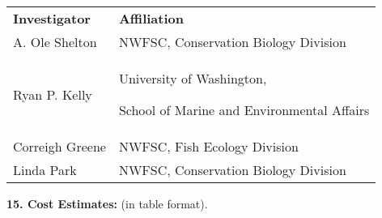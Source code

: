 \documentclass[]{article}
\begin{document}
\begin{longtable}[]{@{}ll@{}}
\toprule
\begin{minipage}[t]{0.47\columnwidth}\raggedright\strut
\textbf{Investigator}\strut
\end{minipage} & \begin{minipage}[t]{0.47\columnwidth}\raggedright\strut
\textbf{Affiliation}\strut
\end{minipage}\tabularnewline
\begin{minipage}[t]{0.47\columnwidth}\raggedright\strut
A. Ole Shelton\strut
\end{minipage} & \begin{minipage}[t]{0.47\columnwidth}\raggedright\strut
NWFSC, Conservation Biology Division\strut
\end{minipage}\tabularnewline
\begin{minipage}[t]{0.48\columnwidth}\raggedright\strut
Ryan P. Kelly\strut
\end{minipage} & \begin{minipage}[t]{0.48\columnwidth}\raggedright\strut
University of Washington,{~}

School of Marine and Environmental Affairs\strut
\end{minipage}\tabularnewline
\begin{minipage}[t]{0.47\columnwidth}\raggedright\strut
Correigh Greene\strut
\end{minipage} & \begin{minipage}[t]{0.47\columnwidth}\raggedright\strut
NWFSC, Fish Ecology Division\strut
\end{minipage}\tabularnewline
\begin{minipage}[t]{0.47\columnwidth}\raggedright\strut
Linda Park\strut
\end{minipage} & \begin{minipage}[t]{0.47\columnwidth}\raggedright\strut
NWFSC, Conservation Biology Division\strut
\end{minipage}\tabularnewline
\bottomrule
\end{longtable}

\textbf{15. Cost Estimates:} (in table format).{~}
\end{document}
